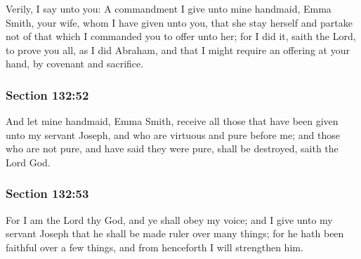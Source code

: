 		Verily, I say unto you: A commandment I give unto mine handmaid, Emma Smith, your wife, whom I have given unto you, that she stay herself and partake not of that which I commanded you to offer unto her; for I did it, saith the Lord, to prove you all, as I did Abraham, and that I might require an offering at your hand, by covenant and sacrifice.


	\subsubsection{Section 132:52} %
		\label{DC132-52}

		And let mine handmaid, Emma Smith, receive all those that have been given unto my servant Joseph, and who are virtuous and pure before me; and those who are not pure, and have said they were pure, shall be destroyed, saith the Lord God.


	\subsubsection{Section 132:53} %
		\label{DC132-53}

		For I am the Lord thy God, and ye shall obey my voice; and I give unto my servant Joseph that he shall be made ruler over many things; for he hath been faithful over a few things, and from henceforth I will strengthen him.


